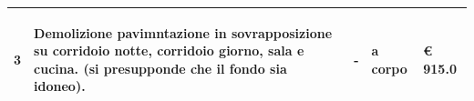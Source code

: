 \documentclass[a4paper]{article}
\begin{document}
\begin{tabular}{ | L{10mm} |  L{86mm} | L{12mm} | L{12mm} | L{16mm} | }
                                 
                                   \vspace{2.5mm}
                                   \begin{spacing}{0}
                                3
                                   \end{spacing} &
                                   \vspace{2.5mm}
                                   \begin{spacing}{0}
                                Demolizione pavimntazione in sovrapposizione su corridoio notte, corridoio giorno, sala e cucina. (si presupponde che il fondo sia idoneo).
                                   \end{spacing} &
                                   \vspace{2.5mm}
                                   \begin{spacing}{0}
                                -
                                   \end{spacing} &
                                   \vspace{2.5mm}
                                   \begin{spacing}{0}
                                a corpo
                                   \end{spacing} &
                                   \vspace{2.5mm}
                                   \begin{spacing}{0}
                                     \euro\hfill 
                                 915.0
                                   \end{spacing} \\
                                   \hline


\end{tabular}
\end{document}
